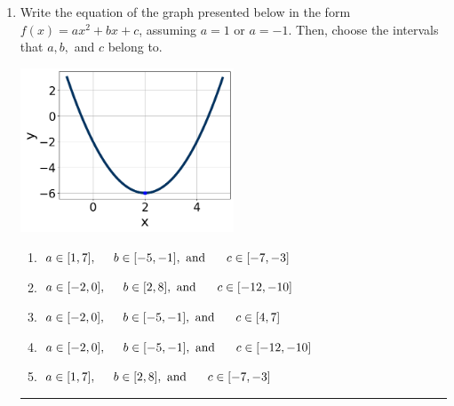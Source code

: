 \documentclass[14pt]{extbook}
\newcommand{\litem}[1]{\item#1\hspace*{-1cm}\rule{\textwidth}{0.4pt}}
\begin{document}
\begin{enumerate}
{\begin{enumerate}[label=\Alph*.]
\end{enumerate} }
\litem{
Write the equation of the graph presented below in the form $f(x)=ax^2+bx+c$, assuming  $a=1$ or $a=-1$. Then, choose the intervals that $a, b,$ and $c$ belong to.
\begin{center}
    \includegraphics[width=0.5\textwidth]{../Figures/quadraticGraphToEquationB.png}
\end{center}
\begin{enumerate}[label=\Alph*.]
\item \( a \in [1, 7], \hspace*{5mm} b \in [-5, -1], \text{ and } \hspace*{5mm} c \in [-7, -3] \)
\item \( a \in [-2, 0], \hspace*{5mm} b \in [2, 8], \text{ and } \hspace*{5mm} c \in [-12, -10] \)
\item \( a \in [-2, 0], \hspace*{5mm} b \in [-5, -1], \text{ and } \hspace*{5mm} c \in [4, 7] \)
\item \( a \in [-2, 0], \hspace*{5mm} b \in [-5, -1], \text{ and } \hspace*{5mm} c \in [-12, -10] \)
\item \( a \in [1, 7], \hspace*{5mm} b \in [2, 8], \text{ and } \hspace*{5mm} c \in [-7, -3] \)


\end{enumerate}}
\end{enumerate}
\end{document}
